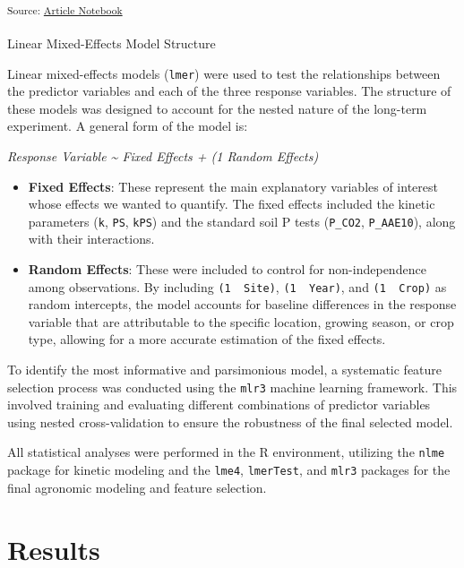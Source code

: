 \documentclass[
  letterpaper,
  DIV=11,
  numbers=noendperiod]{scrartcl}
\makeatletter
\let\oldparagraph\paragraph
\renewcommand{\paragraph}{
    \@ifstar
      \xxxParagraphStar
      \xxxParagraphNoStar
  }
\newcommand{\xxxParagraphStar}[1]{\oldparagraph*{#1}\mbox{}}
\newcommand{\xxxParagraphNoStar}[1]{\oldparagraph{#1}\mbox{}}
\providecommand{\tightlist}{%
  \setlength{\itemsep}{0pt}\setlength{\parskip}{0pt}}\usepackage{longtable,booktabs,array}
\makeatother
\begin{document}
\textsubscript{Source:
\href{https://Andrapodon.github.io/Master-Thesis-P-kinetics/index.qmd.html}{Article
Notebook}}

\paragraph{Linear Mixed-Effects Model
Structure}\label{linear-mixed-effects-model-structure}

Linear mixed-effects models (\texttt{lmer}) were used to test the
relationships between the predictor variables and each of the three
response variables. The structure of these models was designed to
account for the nested nature of the long-term experiment. A general
form of the model is:

\emph{Response Variable \textasciitilde{} Fixed Effects + (1 \textbar{}
Random Effects)}

\begin{itemize}
\tightlist
\item
  \textbf{Fixed Effects}: These represent the main explanatory variables
  of interest whose effects we wanted to quantify. The fixed effects
  included the kinetic parameters (\texttt{k}, \texttt{PS},
  \texttt{kPS}) and the standard soil P tests (\texttt{P\_CO2},
  \texttt{P\_AAE10}), along with their interactions.
\item
  \textbf{Random Effects}: These were included to control for
  non-independence among observations. By including
  \texttt{(1\ \textbar{}\ Site)}, \texttt{(1\ \textbar{}\ Year)}, and
  \texttt{(1\ \textbar{}\ Crop)} as random intercepts, the model
  accounts for baseline differences in the response variable that are
  attributable to the specific location, growing season, or crop type,
  allowing for a more accurate estimation of the fixed effects.
\end{itemize}

To identify the most informative and parsimonious model, a systematic
feature selection process was conducted using the \texttt{mlr3} machine
learning framework. This involved training and evaluating different
combinations of predictor variables using nested cross-validation to
ensure the robustness of the final selected model.

All statistical analyses were performed in the R environment, utilizing
the \texttt{nlme} package for kinetic modeling and the \texttt{lme4},
\texttt{lmerTest}, and \texttt{mlr3} packages for the final agronomic
modeling and feature selection.

\section{Results}\label{results}
\end{document}
